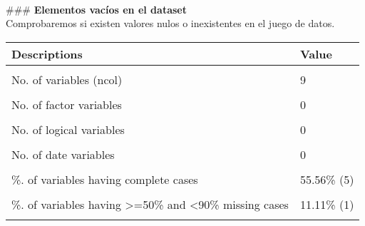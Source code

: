 \documentclass[
]{article}
\newenvironment{Shaded}{\begin{snugshade}}{\end{snugshade}}
\newcommand{\CommentTok}[1]{\textcolor[rgb]{0.56,0.35,0.01}{\textit{#1}}}
\newcommand{\DataTypeTok}[1]{\textcolor[rgb]{0.13,0.29,0.53}{#1}}
\newcommand{\DecValTok}[1]{\textcolor[rgb]{0.00,0.00,0.81}{#1}}
\newcommand{\KeywordTok}[1]{\textcolor[rgb]{0.13,0.29,0.53}{\textbf{#1}}}
\newcommand{\NormalTok}[1]{#1}
\newcommand{\OperatorTok}[1]{\textcolor[rgb]{0.81,0.36,0.00}{\textbf{#1}}}
\newcommand{\StringTok}[1]{\textcolor[rgb]{0.31,0.60,0.02}{#1}}
\begin{document}
\texttt{}\\
\#\#\# \textbf{Elementos vacíos en el dataset} \texttt{}\\
Comprobaremos si existen valores nulos o inexistentes en el juego de
datos. \texttt{}

\begin{Shaded}
\end{Shaded}

\begin{table}
\centering
\begin{tabular}[t]{ll}
\toprule
Descriptions & Value\\
\midrule
\cellcolor{gray!6}{Sample size (nrow)} & \cellcolor{gray!6}{1309}\\
No. of variables (ncol) & 9\\
\cellcolor{gray!6}{No. of numeric/interger variables} & \cellcolor{gray!6}{6}\\
No. of factor variables & 0\\
\cellcolor{gray!6}{No. of text variables} & \cellcolor{gray!6}{3}\\
\addlinespace
No. of logical variables & 0\\
\cellcolor{gray!6}{No. of identifier variables} & \cellcolor{gray!6}{0}\\
No. of date variables & 0\\
\cellcolor{gray!6}{No. of zero variance variables (uniform)} & \cellcolor{gray!6}{0}\\
\%. of variables having complete cases & 55.56\% (5)\\
\addlinespace
\cellcolor{gray!6}{\%. of variables having >0\% and <50\% missing cases} & \cellcolor{gray!6}{33.33\% (3)}\\
\%. of variables having >=50\% and <90\% missing cases & 11.11\% (1)\\
\cellcolor{gray!6}{\%. of variables having >=90\% missing cases} & \cellcolor{gray!6}{0\% (0)}\\
\bottomrule
\end{tabular}
\end{table}
\end{document}
